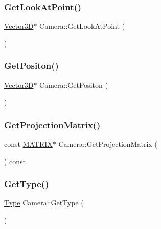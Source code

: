 \subsubsection{\texorpdfstring{Get\+Look\+At\+Point()}{GetLookAtPoint()}}
{\footnotesize\ttfamily \mbox{\hyperlink{class_vector3_d}{Vector3D}}$\ast$ Camera\+::\+Get\+Look\+At\+Point (\begin{DoxyParamCaption}{ }\end{DoxyParamCaption})\hspace{0.3cm}{\ttfamily [inline]}}

\mbox{\label{class_camera_a18f380bd6b2c42162c8fcf7e4441a355}} 
\subsubsection{\texorpdfstring{Get\+Positon()}{GetPositon()}}
{\footnotesize\ttfamily \mbox{\hyperlink{class_vector3_d}{Vector3D}}$\ast$ Camera\+::\+Get\+Positon (\begin{DoxyParamCaption}{ }\end{DoxyParamCaption})\hspace{0.3cm}{\ttfamily [inline]}}

\mbox{\label{class_camera_a473a7a8408bc7a1fdd46d12fa3852846}} 
\subsubsection{\texorpdfstring{Get\+Projection\+Matrix()}{GetProjectionMatrix()}}
{\footnotesize\ttfamily const \mbox{\hyperlink{_vector3_d_8h_a032295cd9fb1b711757c90667278e744}{M\+A\+T\+R\+IX}}$\ast$ Camera\+::\+Get\+Projection\+Matrix (\begin{DoxyParamCaption}{ }\end{DoxyParamCaption}) const\hspace{0.3cm}{\ttfamily [inline]}}

\mbox{\label{class_camera_a3bda45b352bfa163c306c638a2aee1f6}} 
\subsubsection{\texorpdfstring{Get\+Type()}{GetType()}}
{\footnotesize\ttfamily \mbox{\hyperlink{class_camera_a3b0a1f58deca679ac665f61c480d1dcb}{Type}} Camera\+::\+Get\+Type (\begin{DoxyParamCaption}{ }\end{DoxyParamCaption})\hspace{0.3cm}{\ttfamily [inline]}}

